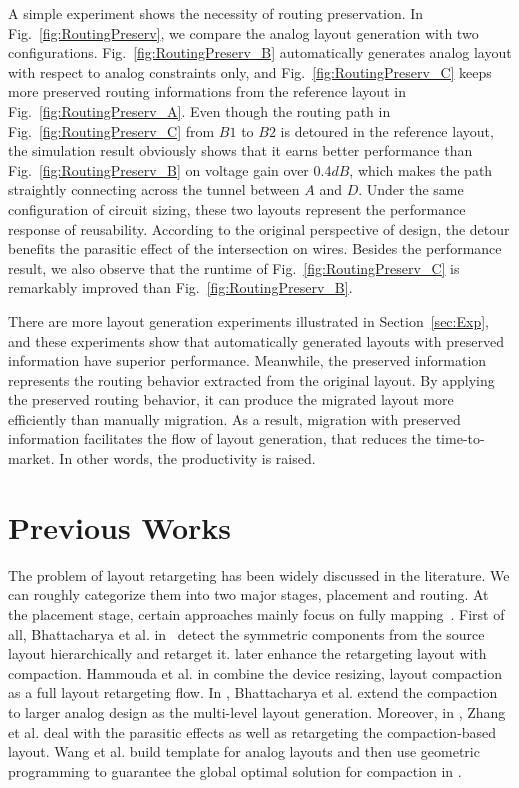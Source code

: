   A simple experiment shows the necessity of routing preservation. In Fig.~\ref{fig:RoutingPreserv}, we compare the analog layout generation with two configurations. Fig.~\ref{fig:RoutingPreserv_B} automatically generates analog layout with respect to analog constraints only, and Fig.~\ref{fig:RoutingPreserv_C} keeps more preserved routing informations from the reference layout in Fig.~\ref{fig:RoutingPreserv_A}. Even though the routing path in Fig.~\ref{fig:RoutingPreserv_C} from $B1$ to $B2$ is detoured in the reference layout, the simulation result obviously shows that it earns better performance than Fig.~\ref{fig:RoutingPreserv_B} on voltage gain over 0.4$dB$, which makes the path straightly connecting across the tunnel between $A$ and $D$. Under the same configuration of circuit sizing, these two layouts represent the performance response of reusability. According to the original perspective of design, the detour benefits the parasitic effect of the intersection on wires. Besides the performance result, we also observe that the runtime of Fig.~\ref{fig:RoutingPreserv_C} is remarkably improved than Fig.~\ref{fig:RoutingPreserv_B}. 
  
  There are more layout generation experiments illustrated in Section~\ref{sec:Exp}, and these experiments show that automatically generated layouts with preserved information have superior performance. Meanwhile, the preserved information represents the routing behavior extracted from the original layout. By applying the preserved routing behavior, it can produce the migrated layout more efficiently than manually migration. As a result, migration with preserved information facilitates the flow of layout generation, that reduces the time-to-market. In other words, the productivity is raised.

  \section{Previous Works}\label{sec:PreWork}

  The problem of layout retargeting has been widely discussed in the literature. We can roughly categorize them into two major stages, placement and routing. At the placement stage, certain approaches mainly focus on fully mapping~\cite{Bhattacharya_ASPDAC04,cbc-bhattacharya-dac04,msc-bhattacharya-tcad06,Zhang_TCAD08,LayoutRetarg_Liu_ASPDAC2010,Wang_ALRGP_TODAES2011}. First of all, Bhattacharya et al. in~\cite{Bhattacharya_ASPDAC04} detect the symmetric components from the source layout hierarchically and retarget it. \cite{cbc-bhattacharya-dac04} later enhance the retargeting layout with compaction. Hammouda et al. in\cite{cart-hammouda-dac06} combine the device resizing, layout compaction as a full layout retargeting flow. In \cite{msc-bhattacharya-tcad06}, Bhattacharya et al. extend the compaction to larger analog design as the multi-level layout generation. Moreover, in \cite{Zhang_TCAD08}, Zhang et al. deal with the parasitic effects as well as retargeting the compaction-based layout. Wang et al. build template for analog layouts and then use geometric programming to guarantee the global optimal solution for compaction in \cite{Wang_ALRGP_TODAES2011}. 

